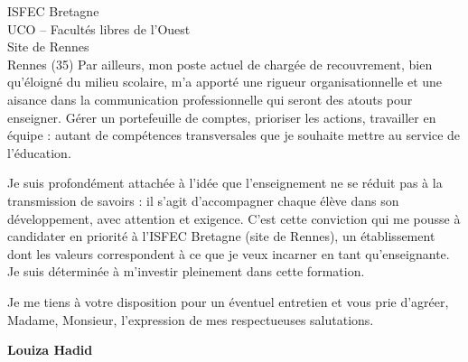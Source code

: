 \documentclass[12pt,a4paper]{letter}
\begin{document}
\begin{letter}{ISFEC Bretagne\\
UCO -- Facultés libres de l'Ouest\\
Site de Rennes\\
Rennes (35)}
\hspace{1cm} Par ailleurs, mon poste actuel de chargée de recouvrement, bien qu'éloigné du milieu scolaire, m'a apporté une rigueur organisationnelle et une aisance dans la communication professionnelle qui seront des atouts pour enseigner. Gérer un portefeuille de comptes, prioriser les actions, travailler en équipe : autant de compétences transversales que je souhaite mettre au service de l'éducation.

\hspace{1cm} Je suis profondément attachée à l'idée que l'enseignement ne se réduit pas à la transmission de savoirs : il s'agit d'accompagner chaque élève dans son développement, avec attention et exigence. C'est cette conviction qui me pousse à candidater en priorité à l'ISFEC Bretagne (site de Rennes), un établissement dont les valeurs correspondent à ce que je veux incarner en tant qu'enseignante. Je suis déterminée à m'investir pleinement dans cette formation.

\closing{Je me tiens à votre disposition pour un éventuel entretien et vous prie d'agréer, Madame, Monsieur, l'expression de mes respectueuses salutations.}

\vspace{0.5cm}
\hfill \textbf{Louiza Hadid}

\end{letter}
\end{document}
